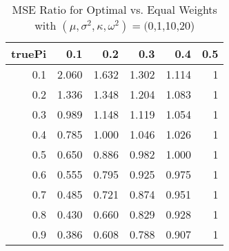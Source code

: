 \begin{table}

\caption{\label{tab:}MSE Ratio for Optimal vs. Equal Weights with $(\mu, \sigma^2, \kappa, \omega^2) = ($0,1,10,20)}
\centering
\begin{tabular}[t]{rrrrrr}
\toprule
truePi & 0.1 & 0.2 & 0.3 & 0.4 & 0.5\\
\midrule
0.1 & 2.060 & 1.632 & 1.302 & 1.114 & 1\\
0.2 & 1.336 & 1.348 & 1.204 & 1.083 & 1\\
0.3 & 0.989 & 1.148 & 1.119 & 1.054 & 1\\
0.4 & 0.785 & 1.000 & 1.046 & 1.026 & 1\\
0.5 & 0.650 & 0.886 & 0.982 & 1.000 & 1\\
0.6 & 0.555 & 0.795 & 0.925 & 0.975 & 1\\
0.7 & 0.485 & 0.721 & 0.874 & 0.951 & 1\\
0.8 & 0.430 & 0.660 & 0.829 & 0.928 & 1\\
0.9 & 0.386 & 0.608 & 0.788 & 0.907 & 1\\
\bottomrule
\end{tabular}
\end{table}
